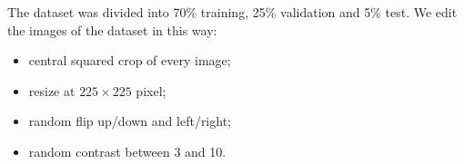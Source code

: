 The dataset was divided into 70\% training, 25\% validation and 5\% test.
We edit the images of the dataset in this way:

\begin{itemize}
    \item central squared crop of every image;
    \item resize at $225 \times 225$ pixel;
    \item random flip up/down and left/right;
    \item random contrast between 3 and 10.
\end{itemize}





